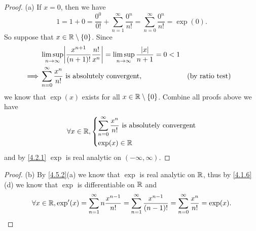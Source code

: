 \begin{proof}{(a)}
  If \(x = 0\), then we have
  \[
    1 = 1 + 0 = \dfrac{0^0}{0!} + \sum_{n = 1}^\infty \dfrac{0^n}{n!} = \sum_{n = 0}^\infty \dfrac{0^n}{n!} = \exp(0).
  \]
  So suppose that \(x \in \mathbb{R} \setminus \left\lbrace0\right\rbrace\).
  Since
  \begin{align*}
             & \limsup_{n \to \infty} \abs{\dfrac{x^{n + 1}}{(n + 1)!} \dfrac{n!}{x^n}} = \limsup_{n \to \infty} \dfrac{\abs{x}}{n + 1} = 0 < 1                             \\
    \implies & \sum_{n = 0}^\infty \dfrac{x^n}{n!} \text{ is absolutely convergent},                                                            &  & \text{(by ratio test)}
  \end{align*}
  we know that \(\exp(x)\) exists for all \(x \in \mathbb{R} \setminus \left\lbrace0\right\rbrace\).
  Combine all proofs above we have
  \[
    \forall x \in \mathbb{R}, \begin{dcases}
      \sum_{n = 0}^\infty \dfrac{x^n}{n!} \text{ is absolutely convergent} \\
      \exp(x) \in \mathbb{R}
    \end{dcases}
  \]
  and by \cref{4.2.1} \(\exp\) is real analytic on \((-\infty, \infty)\).
\end{proof}

\begin{proof}{(b)}
  By \cref{4.5.2}(a) we know that \(\exp\) is real analytic on \(\mathbb{R}\), thus by \cref{4.1.6}(d) we know that \(\exp\) is differentiable on \(\mathbb{R}\) and
  \[
    \forall x \in \mathbb{R}, \exp'(x) = \sum_{n = 1}^\infty n \dfrac{x^{n - 1}}{n!} = \sum_{n = 1}^\infty \dfrac{x^{n - 1}}{(n - 1)!} = \sum_{n = 0}^\infty \dfrac{x^n}{n!} = \exp(x).
  \]
\end{proof}

